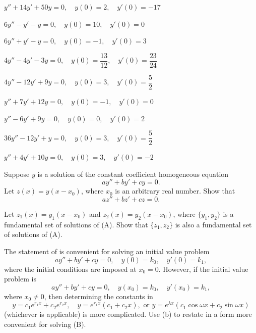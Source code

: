 \begin{exerciselist}
\item\label{exer:5.2.13}$y''+14y'+50y=0, \quad  y(0)=2,\quad y'(0)=-17$


\item\label{exer:5.2.14}$6y''-y'-y=0, \quad  y(0)=10,\quad y'(0)=0$


\item\label{exer:5.2.15}$6y''+y'-y=0, \quad  y(0)=-1,\quad y'(0)=3$


\item\label{exer:5.2.16}$4y''-4y'-3y=0, \quad  y(0)=\dfrac{13}{12},\quad y'(0)=\dfrac{23}{24}$

\item\label{exer:5.2.17}$4y''-12y'+9y=0, \quad  y(0)=3,\quad y'(0)=\dfrac{5}{2}$


\item\label{exer:5.2.18}\CGex
$y''+7y'+12y=0, \quad  y(0)=-1,\quad y'(0)=0$


\item\label{exer:5.2.19}\CGex
$y''-6y'+9y=0, \quad  y(0)=0,\quad y'(0)=2$


\item\label{exer:5.2.20}\CGex
$36y''-12y'+y=0, \quad  y(0)=3,\quad y'(0)=\dfrac{5}{2}$


\item\label{exer:5.2.21}\CGex
$y''+4y'+10y=0, \quad  y(0)=3,\quad y'(0)=-2$

\item\label{exer:5.2.22}\begin{alist}
\item %
Suppose $y$  is a solution of the constant coefficient homogeneous
equation
\[
ay''+by'+cy=0.
\tag{A}
\]
Let $z(x)=y(x-x_0)$, where $x_0$ is an arbitrary real number.
Show that
\[
az''+bz'+cz=0.
\]
\item %
Let $z_1(x)=y_1(x-x_0)$ and $z_2(x)=y_2(x-x_0)$, where $\{y_1,y_2\}$
is a fundamental set of solutions of (A). Show that
$\{z_1,z_2\}$ is also a fundamental set of solutions of
(A).

\item %
The statement of
  is convenient for solving an
initial value problem
\[
ay''+by'+cy=0, \quad  y(0)=k_0,\quad y'(0)=k_1,
\]
where the initial conditions are imposed at $x_0=0$.
However, if the  initial value problem is
\[
ay''+by'+cy=0, \quad  y(x_0)=k_0,\quad y'(x_0)=k_1,
\tag{B}
\]
where $x_0\ne0$, then  determining  the constants in
\[
y=c_1e^{r_1x}+c_2e^{r_2x}, \quad  y=e^{r_1x}(c_1+c_2x),\text{ or }
y=e^{\lambda x}(c_1\cos\omega x+c_2\sin\omega x)
\]
(whichever is applicable) is more complicated. Use (b) to restate
 in a form more convenient for solving
(B).
\end{alist}


\end{exerciselist}
